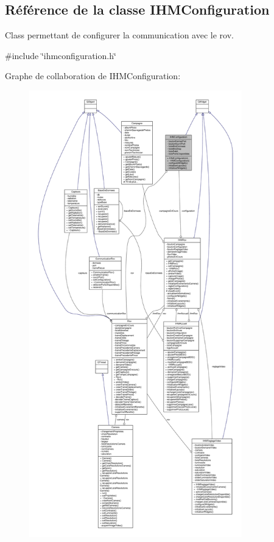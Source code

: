 \hypertarget{class_i_h_m_configuration}{}\subsection{Référence de la classe I\+H\+M\+Configuration}
\label{class_i_h_m_configuration}


Class permettant de configurer la communication avec le rov.  




{\ttfamily \#include \char`\"{}ihmconfiguration.\+h\char`\"{}}



Graphe de collaboration de I\+H\+M\+Configuration\+:
\nopagebreak
\begin{figure}[H]
\begin{center}
\leavevmode
\includegraphics[height=550pt]{class_i_h_m_configuration__coll__graph}
\end{center}
\end{figure}
